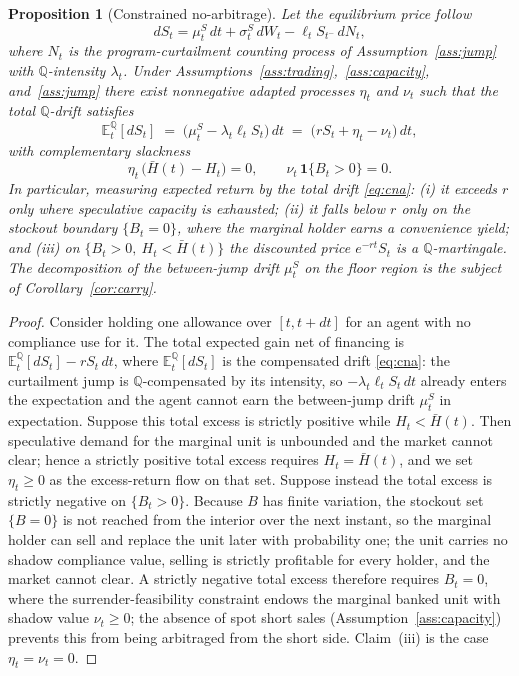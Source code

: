 \documentclass[11pt,letterpaper]{article}
\theoremstyle{plain}
\newtheorem{proposition}[theorem]{Proposition}
\theoremstyle{definition}
\newcommand{\E}{\mathbb{E}}                  %
\newcommand{\Qmeasure}{\mathbb{Q}}           %
\numberwithin{equation}{section}
\begin{document}
\begin{proposition}[Constrained no-arbitrage]\label{prop:cna}
Let the equilibrium price follow
\begin{equation}\label{eq:Sdynamics}
  dS_t = \mu^S_t\,dt + \sigma^S_t\,dW_t - \ell_t S_{t^-}\,dN_t,
\end{equation}
where $N_t$ is the program-curtailment counting process of Assumption~\ref{ass:jump} with $\Qmeasure$-intensity $\lambda_t$. Under Assumptions~\ref{ass:trading},~\ref{ass:capacity}, and~\ref{ass:jump} there exist nonnegative adapted processes $\eta_t$ and $\nu_t$ such that the total $\Qmeasure$-drift satisfies
\begin{equation}\label{eq:cna}
  \E_t^{\Qmeasure}[dS_t]
  \;=\;\bigl(\mu^S_t - \lambda_t\ell_t S_t\bigr)\,dt
  \;=\;\bigl(rS_t + \eta_t - \nu_t\bigr)\,dt,
\end{equation}
with complementary slackness
\begin{equation}\label{eq:cs}
  \eta_t\,\bigl(\bar H(t) - H_t\bigr) = 0, \qquad \nu_t\,\mathbf{1}\{B_t>0\} = 0.
\end{equation}
In particular, measuring expected return by the total drift \eqref{eq:cna}: (i) it exceeds $r$ only where speculative capacity is exhausted; (ii) it falls below $r$ only on the stockout boundary $\{B_t=0\}$, where the marginal holder earns a convenience yield; and (iii) on $\{B_t>0,\ H_t<\bar H(t)\}$ the discounted price $e^{-rt}S_t$ is a $\Qmeasure$-martingale. The decomposition of the between-jump drift $\mu^S_t$ on the floor region is the subject of Corollary~\ref{cor:carry}.
\end{proposition}

\begin{proof}
Consider holding one allowance over $[t,t+dt]$ for an agent with no compliance use for it. The total expected gain net of financing is $\E_t^{\Qmeasure}[dS_t] - rS_t\,dt$, where $\E_t^{\Qmeasure}[dS_t]$ is the compensated drift \eqref{eq:cna}: the curtailment jump is $\Qmeasure$-compensated by its intensity, so $-\lambda_t\ell_t S_t\,dt$ already enters the expectation and the agent cannot earn the between-jump drift $\mu^S_t$ in expectation. Suppose this total excess is strictly positive while $H_t<\bar H(t)$. Then speculative demand for the marginal unit is unbounded and the market cannot clear; hence a strictly positive total excess requires $H_t=\bar H(t)$, and we set $\eta_t\ge 0$ as the excess-return flow on that set. Suppose instead the total excess is strictly negative on
$\{B_t>0\}$. Because $B$ has finite variation, the stockout set $\{B=0\}$ is not reached from the interior over the next instant, so the marginal holder can sell and replace the unit later with probability one; the unit carries no shadow compliance value, selling is strictly profitable for every holder, and the market cannot clear. A strictly negative total excess therefore requires $B_t=0$, where the surrender-feasibility constraint endows the marginal banked unit with shadow value $\nu_t\ge 0$; the absence of spot short sales (Assumption~\ref{ass:capacity}) prevents this from being arbitraged from the short side. Claim~(iii) is the case $\eta_t=\nu_t=0$.
\end{proof}
\end{document}
